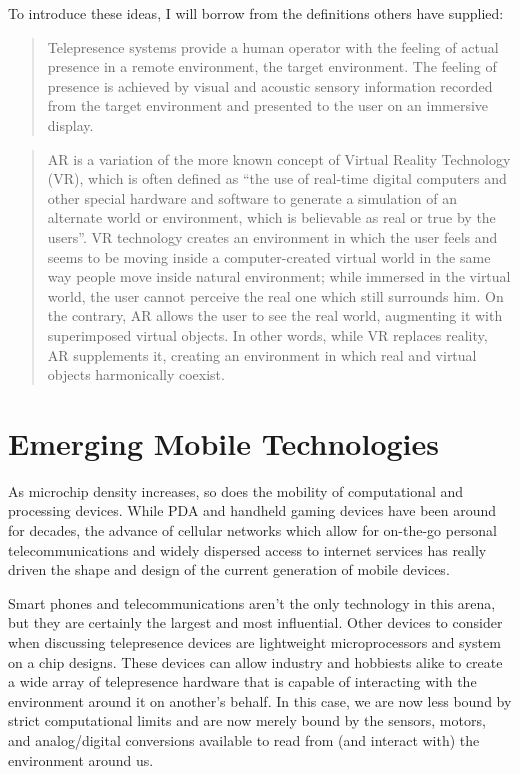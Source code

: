 \documentclass[a4paper,12pt]{report}
\begin{document}
To introduce these ideas, I will borrow from the definitions others have supplied:
\begin{quotation}
Telepresence systems provide a human operator with the feeling of actual presence in a remote environment, the target environment. The feeling of presence is achieved by visual and acoustic sensory information recorded from the target environment and presented to the user on an immersive display.
	\begin{flushright}
		\cite{6094998}
	\end{flushright}
\end{quotation}
\begin{quotation}
AR is a variation of the more known concept of Virtual Reality Technology (VR), which is often defined as “the use of real-time digital computers and other special hardware and software to generate a simulation of an alternate world or environment, which is believable as real or true by the users”. VR technology creates an environment in which the user feels and seems to be moving inside a computer-created virtual world in the same way people move inside natural environment; while immersed in the virtual world, the user cannot perceive the real one which still surrounds him. On the contrary, AR allows the user to see the real world, augmenting it with superimposed virtual objects. In other words, while VR replaces reality, AR supplements it, creating an environment in which real and virtual objects harmonically coexist.
	\begin{flushright}
		\cite{5970856}
	\end{flushright}
\end{quotation}

\section{Emerging Mobile Technologies}
As microchip density increases, so does the mobility of computational and processing devices. While PDA and handheld gaming devices have been around for decades, the advance of cellular networks which allow for on-the-go personal telecommunications and widely dispersed access to internet services has really driven the shape and design of the current generation of mobile devices.

Smart phones and telecommunications aren't the only technology in this arena, but they are certainly the largest and most influential. Other devices to consider when discussing telepresence devices are lightweight microprocessors and system on a chip designs. These devices can allow industry and hobbiests alike to create a wide array of telepresence hardware that is capable of interacting with the environment around it on another's behalf. In this case, we are now less bound by strict computational limits and are now merely bound by the sensors, motors, and analog/digital conversions available to read from (and interact with) the environment around us.
\end{document}
